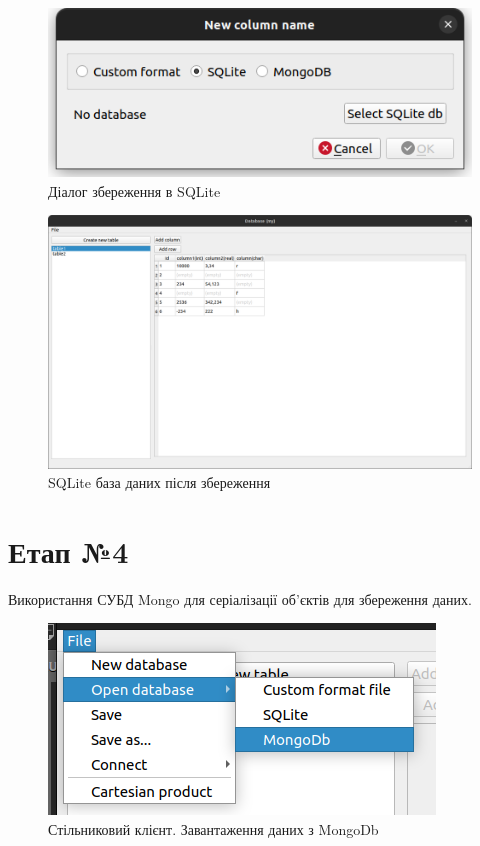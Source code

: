 \documentclass[a4paper, 12pt]{article}
\begin{document}
\begin{figure}[H]
\centering
\includegraphics[scale=0.8]{resources/SQLiteSaveDialog.png}
\caption{Діалог збереження в SQLite}
\end{figure} 

\begin{figure}[H]
\centering
\includegraphics[scale=0.3]{resources/SQLite.png}
\caption{SQLite база даних після збереження}
\end{figure} 
 
\section{Етап №4}
Використання  СУБД Mongo для серіалізації об'єктів для збереження даних.

\begin{figure}[H]
\centering
\includegraphics[scale=0.8]{resources/MongoDbLoadMenu.png}
\caption{Стільниковий клієнт. Завантаження даних з MongoDb}
\end{figure} 
\end{document}
